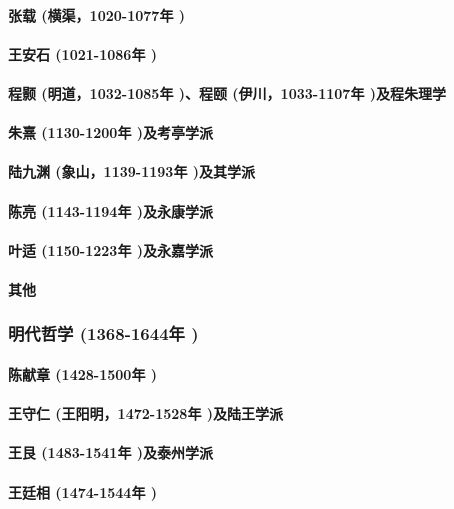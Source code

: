 \documentclass[UTF8]{../RepresentationUniverse}
\begin{document}
        \paragraph{张载 (横渠，1020-1077年 )}
        \paragraph{王安石 (1021-1086年 )}
        \paragraph{程颢 (明道，1032-1085年 )、程颐 (伊川，1033-1107年 )及程朱理学}
        \paragraph{朱熹 (1130-1200年 )及考亭学派}
        \paragraph{陆九渊 (象山，1139-1193年 )及其学派}
        \paragraph{陈亮 (1143-1194年 )及永康学派}
        \paragraph{叶适 (1150-1223年 )及永嘉学派}
        \paragraph{其他}

    \subsubsection{明代哲学 (1368-1644年 )}
        \paragraph{陈献章 (1428-1500年 )}
        \paragraph{王守仁 (王阳明，1472-1528年 )及陆王学派}
        \paragraph{王艮 (1483-1541年 )及泰州学派}
        \paragraph{王廷相 (1474-1544年 )}
\end{document}
